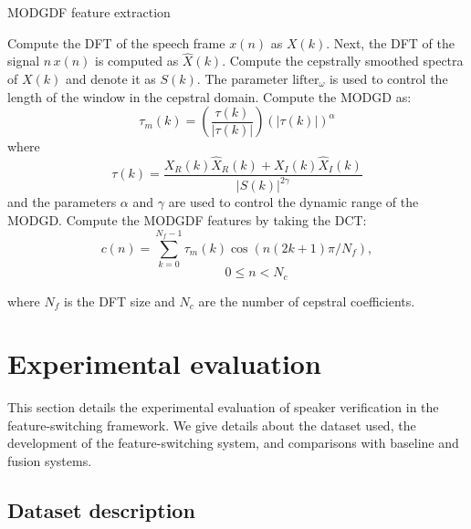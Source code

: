 \documentclass[preprint,12pt,5p]{elsarticle}
\begin{document}
\begin{algorithm}[!th]
\caption{MODGDF feature extraction}
\label{algo:modgd}
\begin{algorithmic}[1]

\STATE {}
\STATE Compute the DFT of the speech frame $x(n)$ as $X(k)$.
\STATE Next, the DFT of the signal $n\,x(n)$ is computed as $\hat{X}(k)$.
\STATE Compute the cepstrally smoothed spectra of $X(k)$ and denote it as
$S(k)$. The parameter $\textrm{lifter}_\omega$ is used to control the length of
the window in the cepstral domain. 
\STATE Compute the MODGD as:
\begin{equation*}
\tau_m(k) = \left(\frac{\tau(k)}{|\tau(k)|}\right) (|\tau(k)|)^\alpha
\end{equation*}
where
\begin{equation*}
\tau(k) = \frac{X_R(k)\hat{X}_R(k)+X_I(k)\hat{X}_I(k)}{|S(k)|^{2\gamma}}
\end{equation*}
and the parameters $\alpha$ and $\gamma$ are used to control the dynamic range
of the MODGD. 
\STATE Compute the MODGDF features by taking the DCT:
\begin{equation*}
c(n) = \sum_{k=0}^{N_f-1}\tau_m(k)\cos(n(2k+1)\pi/N_f), 
\end{equation*}
\vspace{-5mm}
\begin{equation*}
\quad \quad \quad 0 \leq n < N_c
\end{equation*}

where $N_f$ is the DFT size and $N_c$ are the number of cepstral coefficients. 

\end{algorithmic}
\end{algorithm}

\section{Experimental evaluation}
\label{sec:expts}
This section details the experimental evaluation of speaker verification in the
feature-switching framework. We give details about the dataset used, the
development of the feature-switching system, and comparisons with baseline and
fusion systems.

\flushend
\subsection{Dataset description}
\label{sec:dB}
\end{document}
